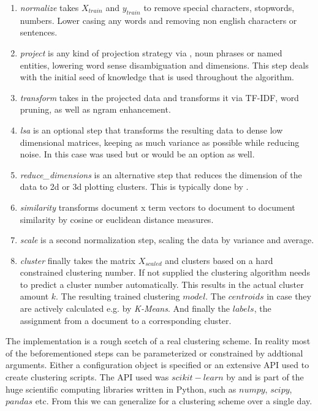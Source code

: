   \begin{enumerate}
    \item \emph{normalize} takes $X_{train}$ and $y_{train}$ to remove special characters, stopwords, numbers. Lower casing any words and removing non english characters or sentences. 
    \item \emph{project} is any kind of projection strategy via \wordnet{}, noun phrases or named entities, lowering word sense disambiguation and dimensions. This step deals with the initial seed of knowledge that is used throughout the algorithm.
    \item \emph{transform} takes in the projected data and transforms it via TF-IDF, word pruning, as well as ngram enhancement.
    \item \emph{lsa} is an optional step that transforms the resulting data to dense low dimensional matrices, keeping as much variance as possible while reducing noise. In this case \lsa{} was used but \lda{} or \hdp{} would be an option as well. 
    \item \emph{reduce\_dimensions} is an alternative step that reduces the dimension of the data to 2d or 3d plotting clusters. This is typically done by \pca{}.
    \item \emph{similarity} transforms document x term vectors to document to document similarity by cosine or euclidean distance measures.
    \item \emph{scale} is a second normalization step, scaling the data by variance and average.
    \item \emph{cluster} finally takes the matrix $X_{scaled}$ and clusters based on a hard constrained clustering number. If not supplied the clustering algorithm needs to predict a cluster number automatically. This results in the actual cluster amount $k$. The resulting trained clustering $model$. The $centroids$ in case they are actively calculated e.g. by \emph{K-Means}. And finally the $labels$, the assignment from a document to a corresponding cluster.
  \end{enumerate}

The implementation is a rough scetch of a real clustering scheme. In reality most of the beforementioned steps can be parameterized or constrained by addtional arguments. Either a configuration object is specified or an extensive API used to create clustering scripts. The API used was $scikit-learn$ by \cite{ScikitLearn} and is part of the huge scientific computing libraries written in Python, such as $numpy$, $scipy$, $pandas$ etc. From this we can generalize for a clustering scheme over a single day.


